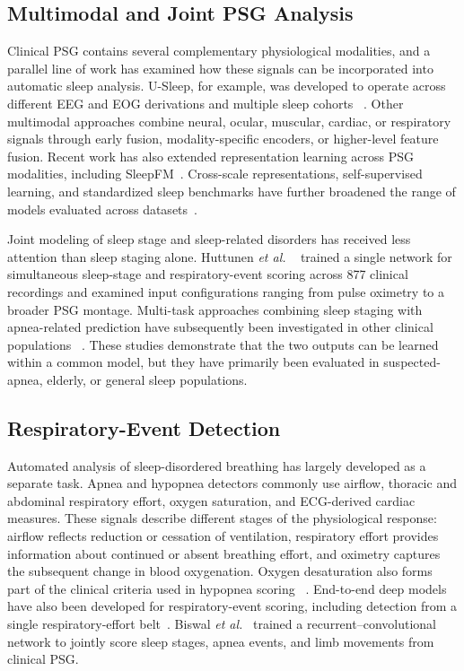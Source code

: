 \documentclass[a4paper,fleqn]{cas-sc}
\begin{document}
\subsection{Multimodal and Joint PSG Analysis}

Clinical PSG contains several complementary physiological modalities, and a
parallel line of work has examined how these signals can be incorporated into
automatic sleep analysis. U-Sleep, for example, was developed to operate across
different EEG and EOG derivations and multiple sleep cohorts
~\cite{perslev2021usleep}. Other multimodal approaches combine neural, ocular,
muscular, cardiac, or respiratory signals through early fusion,
modality-specific encoders, or higher-level feature fusion. Recent work has also extended representation learning across PSG modalities, including SleepFM~\cite{sleepfm2026}. Cross-scale representations, self-supervised learning, and standardized sleep benchmarks have further broadened the range of models evaluated across datasets~\cite{csbrain2025,sleepyland2026,estevan2025ssl}.

Joint modeling of sleep stage and sleep-related disorders has received less
attention than sleep staging alone. Huttunen \emph{et al.}
~\cite{huttunen2023simultaneous} trained a single network for simultaneous
sleep-stage and respiratory-event scoring across 877 clinical recordings and
examined input configurations ranging from pulse oximetry to a broader PSG
montage. Multi-task approaches combining sleep staging with apnea-related
prediction have subsequently been investigated in other clinical populations
~\cite{multitask2025elderly}. These studies demonstrate that the two outputs can
be learned within a common model, but they have primarily been evaluated in
suspected-apnea, elderly, or general sleep populations.

\subsection{Respiratory-Event Detection}

Automated analysis of sleep-disordered breathing has largely developed as a
separate task. Apnea and hypopnea detectors commonly use airflow, thoracic and
abdominal respiratory effort, oxygen saturation, and ECG-derived cardiac
measures. These signals describe different stages of the physiological response:
airflow reflects reduction or cessation of ventilation, respiratory effort
provides information about continued or absent breathing effort, and oximetry
captures the subsequent change in blood oxygenation. Oxygen desaturation also
forms part of the clinical criteria used in hypopnea scoring
~\cite{aasm2023manual}. End-to-end deep models have also been developed for
respiratory-event scoring, including detection from a single respiratory-effort
belt~\cite{nassi2022effortbelt}. Biswal \emph{et al.}~\cite{biswal2018expert}
trained a recurrent--convolutional network to jointly score sleep stages, apnea
events, and limb movements from clinical PSG.
\end{document}
